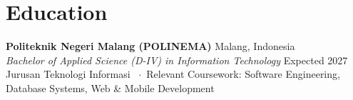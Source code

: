 \section{Education}

\noindent\textbf{Politeknik Negeri Malang (POLINEMA)} \hfill {\small Malang, Indonesia}\\%
\textit{\small Bachelor of Applied Science (D-IV) in Information Technology} \hfill {\small Expected 2027}\\%
{\footnotesize Jurusan Teknologi Informasi \ $\cdot$\ Relevant Coursework: Software Engineering, Database Systems, Web \& Mobile Development}
